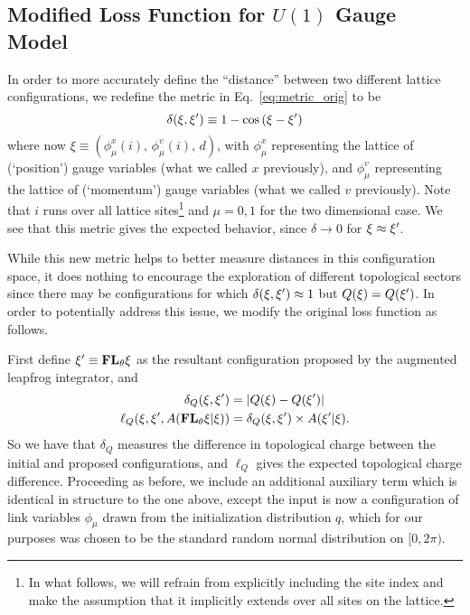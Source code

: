 \documentclass[../main.tex]{subfiles}
\begin{document}
\subsection{Modified Loss Function for \texorpdfstring{$U(1)$}{U (1)} Gauge
Model}%
\label{subsec:l2hmc_modifiedloss}
%
In order to more accurately define the ``distance'' between two different
lattice configurations, we redefine the metric in Eq.~\ref{eq:metric_orig} to
be
%
\begin{equation}
  \delta(\xi, {\xi^{\prime}}) \equiv 1 - \cos\left(\xi - \xi^{\prime}\right)
\label{eq:metric_new}
\end{equation}
%
where now $\xi \equiv {\left(\phi_{\mu}^{x}(i), \,\phi_{\mu}^{v}(i),\,
d\right)}$, with $\phi_{\mu}^{x}$ representing the lattice of (`position')
gauge variables (what we called $x$ previously), and $\phi_{\mu}^{v}$
representing the lattice of (`momentum') gauge variables (what we called $v$
previously). Note that $i$ runs over all lattice sites\footnote{In what
  follows, we will refrain from explicitly including the site index and make
  the assumption that it implicitly extends over all sites on the lattice.} and
  $\mu=0, 1$ for the two dimensional case.
%
We see that this metric gives the expected behavior, since $\delta \rightarrow
0$ for $\xi \approx {\xi^{\prime}}$.

While this new metric helps to better measure distances in this configuration
space, it does nothing to encourage the exploration of different topological
sectors since there may be configurations for which $\delta(\xi, {\xi^{\prime}}) \approx
1$ but $Q(\xi) = Q({\xi^{\prime}})$.
%
In order to potentially address this issue, we modify the original loss
function as follows.


First define ${\xi^{\prime}}\equiv {\mathbf{FL}_{\theta}} \xi$ as the resultant configuration proposed by
the augmented leapfrog integrator, and
%
\begin{align}
  \delta_{Q}{(\xi, \xi^{\prime})} &= \left|Q{(\xi)} - Q{(\xi^{\prime})}\right| \\
  \ell_{Q}{\left(\xi, {\xi^{\prime}}, A{({\mathbf{FL}_{\theta}}\xi|\xi)}\right)} &= \delta_{Q}{(\xi,{\xi^{\prime}})}
    \times A{({\xi^{\prime}}|\xi)}.
\end{align}
%
So we have that $\delta_{Q}$ measures the difference in topological charge
between the initial and proposed configurations, and $\ell_{Q}$ gives the
expected topological charge difference.
%
Proceeding as before, we include an additional auxiliary term which is
identical in structure to the one above, except the input is now a
configuration of link variables $\phi_{\mu}$ drawn from the initialization
distribution $q$, which for our purposes was chosen to be the standard random
normal distribution on $[0, 2\pi)$. %
\end{document}
